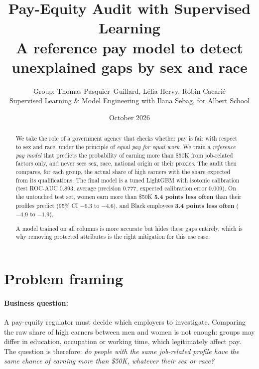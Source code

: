\documentclass[11pt,a4paper]{article}
\title{\color{navy}\textbf{Pay-Equity Audit with Supervised Learning}\\[4pt]
\large A reference pay model to detect unexplained gaps by sex and race}
\author{Group: Thomas Pasquier--Guillard, Lélia Hervy, Robin Cacarié\\[4pt]
\small Supervised Learning \& Model Engineering with Ilana Sebag, for Albert School}
\date{October 2026}
\begin{document}
\maketitle

\begin{center}
\end{center}

\begin{abstract}
\noindent We take the role of a government agency that checks whether pay is fair with respect to sex and race, under the principle of \emph{equal pay for equal work}. We train a \emph{reference pay model} that predicts the probability of earning more than \$50K from job-related factors only, and never sees sex, race, national origin or their proxies. The audit then compares, for each group, the actual share of high earners with the share expected from its qualifications. The final model is a tuned LightGBM with isotonic calibration (test ROC-AUC 0.893, average precision 0.777, expected calibration error 0.009). On the untouched test set, women earn more than \$50K \textbf{5.4 points less often} than their profiles predict (95\% CI $-6.3$ to $-4.6$), and Black employees \textbf{3.4 points less often} ($-4.9$ to $-1.9$).

\noindent A model trained on all columns is more accurate but hides these gaps entirely, which is why removing protected attributes is the right mitigation for this use case.
\end{abstract}

\section{Problem framing}

\paragraph{Business question:} A pay-equity regulator must decide which employers to investigate. Comparing the raw share of high earners between men and women is not enough: groups may differ in education, occupation or working time, which legitimately affect pay. The question is therefore: \emph{do people with the same job-related profile have the same chance of earning more than \$50K, whatever their sex or race?}
\end{document}
